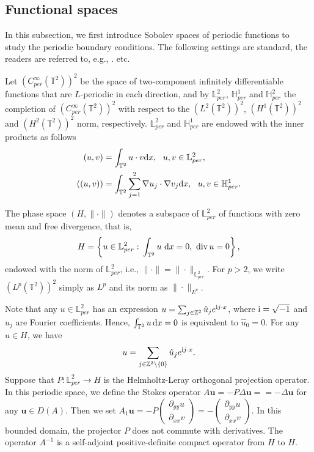 \documentclass{elsarticle}
\theoremstyle{definition}
\numberwithin{equation}{section}
\newcommand{\TT}{\mathbb{T}}
\newcommand{\LL}{\mathbb{L}_{per}}
\newcommand{\HH}{\mathbb{H}_{per}}
\renewcommand{\d}{{\rm{d}}}
\begin{document}
\subsection{Functional spaces}

In this subsection, we  first introduce Sobolev spaces of periodic functions to study the periodic boundary conditions. The following settings are standard, the readers are referred to, e.g., \cite{bahouri,robinson01,temam1,temam}. etc.

 Let $(C_{per}^\infty(\mathbb T^2))^2 $ be the space of two-component infinitely differentiable functions that are $L$-periodic in each direction, and by  $\LL^2$, $\HH^1$ and $\HH^2$ the completion of $(C_{per}^\infty(\mathbb T^2))^2 $  with respect to the $(L^2(\TT^2))^2$, $(H^1(\TT^2))^2$ and $(H^2(\TT^2))^2$ norm, respectively.  $\LL^2$ and $\HH^1$ are endowed with the inner products as follows
 \begin{align*}
 (u,v)&=\int_{\mathbb{T}^2}u\cdot v\d x,~~u,v\in\LL^2,\\
  ((u,v))&=\int_{\mathbb{T}^2}\sum\limits_{j=1}^2\nabla u_j\cdot \nabla v_j\d x,~~u,v\in\HH^1.
 \end{align*}

 The phase space $(H,\|\cdot\|)$ denotes a subspace of  $\LL^2$ of functions with zero mean and free divergence,  that is,
\begin{align*}
H= \left \{u\in \LL ^2:
\, \int_{\mathbb T^2}u \ \d x=0,\  {\rm div}\, u=0 \right \},
\end{align*}
endowed with the norm of $\LL^2$, i.e.,
  $\|\cdot\|=\|\cdot\|_{\LL^2}$.   For $p>2$,  we write $(L^p(\TT^2))^2$  simply as $L^p$ and its norm as $\|\cdot\|_{L^p}$.

Note that any $u\in \LL^2 $ has an expression $u=\sum_{j\in \mathbb{Z}^2} \hat u_j e^{{\rm i}j\cdot x}$, where  $ {\rm i}= \sqrt{-1}$ and $\hat u_j$ are Fourier coefficients.  Hence, $\int_{\mathbb T^2}    u \,  \d x=0$ is equivalent to $\hat u_0=0$. For any  $u\in H $, we have
\[
 u =\sum_{j\in \mathbb Z^2\setminus\{0\}} \hat u_j e^{{\rm i}j\cdot x} .
\]
Suppose that $P: \LL ^2\rightarrow H$ is the Helmholtz-Leray orthogonal projection operator. In  this periodic space, we define the Stokes operator $A\textbf{u}=-P\Delta\textbf{u}==-\Delta\textbf{u}$ for any $\textbf{u}\in D(A) $. Then we set  $A_1\textbf{u}=-P\left(
\begin{array}{ccc}
\partial_{yy}u\\ \partial_{xx}v
\end{array}\right)=-\left(
\begin{array}{ccc}
\partial_{yy}u\\ \partial_{xx}v
\end{array}\right)$. In  this bounded domain, the projector $P$ does not commute with derivatives. The operator $A^{-1}$  is a self-adjoint positive-definite compact operator from $H$  to $H$.
\end{document}
